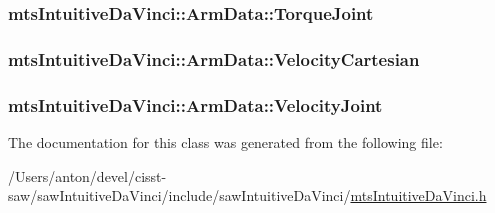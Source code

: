 \subsubsection[{Torque\+Joint}]{ mts\+Intuitive\+Da\+Vinci\+::\+Arm\+Data\+::\+Torque\+Joint}\label{classmts_intuitive_da_vinci_1_1_arm_data_a2575a91719913cc0d8ce506c636fc9fa}
\hypertarget{classmts_intuitive_da_vinci_1_1_arm_data_aa26ed3e13aeab62e1fdae9bd75ee170f}{}
\subsubsection[{Velocity\+Cartesian}]{ mts\+Intuitive\+Da\+Vinci\+::\+Arm\+Data\+::\+Velocity\+Cartesian}\label{classmts_intuitive_da_vinci_1_1_arm_data_aa26ed3e13aeab62e1fdae9bd75ee170f}
\hypertarget{classmts_intuitive_da_vinci_1_1_arm_data_a664aeae6730eb511571774698f962def}{}
\subsubsection[{Velocity\+Joint}]{ mts\+Intuitive\+Da\+Vinci\+::\+Arm\+Data\+::\+Velocity\+Joint}\label{classmts_intuitive_da_vinci_1_1_arm_data_a664aeae6730eb511571774698f962def}


The documentation for this class was generated from the following file\+:\begin{DoxyCompactItemize}
\item 
/\+Users/anton/devel/cisst-\/saw/saw\+Intuitive\+Da\+Vinci/include/saw\+Intuitive\+Da\+Vinci/\hyperlink{mts_intuitive_da_vinci_8h}{mts\+Intuitive\+Da\+Vinci.\+h}\end{DoxyCompactItemize}
